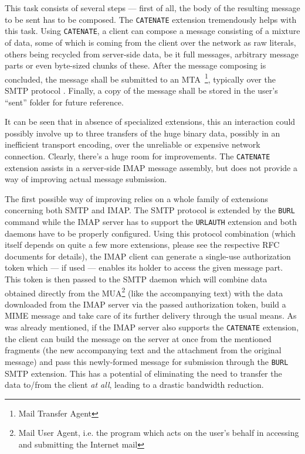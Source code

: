 \documentclass[trojita]{subfiles}
\begin{document}
This task consists of several steps --- first of all, the body of the resulting message to be sent has to be composed.
The {\tt CATENATE} extension tremendously helps with this task.  Using {\tt CATENATE}, a client can compose a message
consisting of a mixture of data, some of which is coming from the client over the network as raw literals, others being
recycled from server-side data, be it full messages, arbitrary message parts or even byte-sized chunks of these.  After
the message composing is concluded, the message shall be submitted to an MTA~\footnote{Mail Transfer Agent}, typically
over the SMTP protocol \cite{rfc6409}.  Finally, a copy of the message shall be stored in the user's ``sent'' folder for
future reference.

It can be seen that in absence of specialized extensions, this an interaction could possibly involve up to three
transfers of the huge binary data, possibly in an inefficient transport encoding, over the unreliable or expensive
network connection.  Clearly, there's a huge room for improvements.  The {\tt CATENATE} extension assists in a
server-side IMAP message assembly, but does not provide a way of improving actual message submission.

The first possible way of improving relies on a whole family of extensions concerning both SMTP and IMAP.  The SMTP
protocol is extended by the {\tt BURL} command \cite{rfc4468} while the IMAP server has to support the {\tt URLAUTH}
extension \cite{rfc4467} and both daemons have to be properly configured.  Using this protocol combination (which itself
depends on quite a few more extensions, please see the respective RFC documents for details), the IMAP client can
generate a single-use authorization token which --- if used --- enables its holder to access the given message part.
This token is then passed to the SMTP daemon which will combine data obtained directly from the MUA\footnote{Mail User
Agent, i.e. the program which acts on the user's behalf in accessing and submitting the Internet mail} (like the
accompanying text) with the data downloaded from the IMAP server via the passed authorization token, build a MIME
message and take care of its further delivery through the usual means.  As was already mentioned, if the IMAP server
also supports the {\tt CATENATE} extension, the client can build the message on the server at once from the mentioned
fragments (the new accompanying text and the attachment from the original message) and pass this newly-formed message
for submission through the {\tt BURL} SMTP extension.  This has a potential of eliminating the need to transfer the data
to/from the client {\em at all}, leading to a drastic bandwidth reduction.
\end{document}

